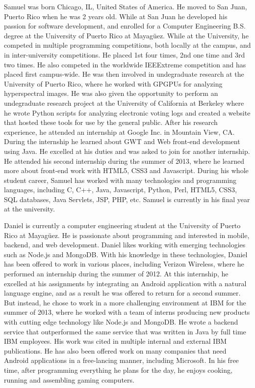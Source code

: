 Samuel was born Chicago, IL, United States of America. He
moved to San Juan, Puerto Rico when he was 2 years old. While at San Juan he
developed his passion for software development, and enrolled for a Computer
Engineering B.S. degree at the University of Puerto Rico at Mayagüez. While at
the University, he competed in multiple programming competitions, both locally
at the campus, and in inter-university competitions. He placed 1st four times,
2nd one time and 3rd two times. He also competed in the worldwide IEEExtreme
competition and has placed first campus-wide. He was then involved in
undegraduate research at the University of Puerto Rico, where he worked with
GPGPUs for analyzing hyperspectral images. He was also given the opportunity to
perform an undegraduate research project at the University of California at
Berkeley where he wrote Python scripts for analyzing electronic voting logs and
created a website that hosted these tools for use by the general public. After
his research experience, he attended an internship at Google Inc. in Mountain
View, CA. During the internship he learned about GWT and Web front-end
development using Java. He excelled at his duties and was asked to join for
another internship. He attended his second internship during the summer of 2013,
where he learned more about front-end work with HTML5, CSS3 and Javascript.
During his whole student career, Samuel has worked with many technologies and
programming languages, including C, C++, Java, Javascript, Python, Perl, HTML5,
CSS3, SQL databases, Java Servlets, JSP, PHP, etc. Samuel is currently in his
final year at the university.


Daniel is currently a computer engineering student at the University of
Puerto Rico at Mayagüez. He is passionate about programming and interested in
mobile, backend, and web development. Daniel likes working with emerging
technologies such as Node.js and MongoDB. With his knowledge in these
technologies, Daniel has been offered to work in various places, including
Verizon Wireless, where he performed an internship during the summer of 2012. At
this internship, he excelled at his assignments by integrating an Android
application with a natural language engine, and as a result he was offered to
return for a second summer. But instead, he chose to work in a more challenging
environment at IBM for the summer of 2013, where he worked with a team of
interns producing new products with cutting edge technology like Node.js and
MongoDB. He wrote a backend service that outperformed the same service that was
written in Java by full time IBM employees. His work was cited in multiple
internal and external IBM publications. He has also been offered work on many
companies that need Android applications in a free-lancing manner, including
Microsoft. In his free time, after programming everything he plans for the day,
he enjoys cooking, running and assembling gaming computers.